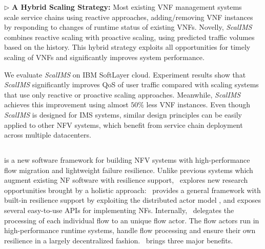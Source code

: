 $\triangleright$ \textbf{A Hybrid Scaling Strategy:} Most existing VNF management systems~\cite{wood2007black}~\cite{gember2012stratos} scale service chains using reactive approaches, adding/removing VNF instances by responding to changes of runtime status of existing VNFs. Novelly, \textit{ScalIMS} combines reactive scaling with proactive scaling, using predicted traffic volumes based on the history. This hybrid strategy exploits all opportunities for timely scaling of VNFs and significantly improves system performance.

We evaluate \textit{ScalIMS} on IBM SoftLayer cloud. Experiment results show that \textit{ScalIMS} significantly improves QoS of user traffic compared with scaling systems that use only reactive or proactive scaling approaches. Meanwhile, \textit{ScalIMS} achieves this improvement %
 using almost $50\%$ less VNF instances. %
Even though \textit{ScalIMS} is designed for IMS systems, similar design principles can be easily applied to other NFV systems, which benefit from service chain deployment across multiple datacenters.

\subsection{\nfactor}

\nfactor is a new software framework for building NFV systems with high-performance flow migration and lightweight failure resilience. Unlike previous systems \cite{sherry2015rollback, rajagopalan2013pico, rajagopalan2013split, gember2015opennf} which augment existing NF software with resilience support, \nfactor~explores new research opportunities brought by a holistic approach: \nfactor~provides a general framework with built-in resilience support by exploiting the distributed actor model \cite{actor-wiki}, and exposes several easy-to-use APIs for implementing NFs. Internally, \nfactor~delegates the processing of each individual flow to an unique flow actor. The flow actors run in high-performance runtime systems, handle flow processing and ensure their own resilience in a largely decentralized fashion. \nfactor~brings three major benefits.

